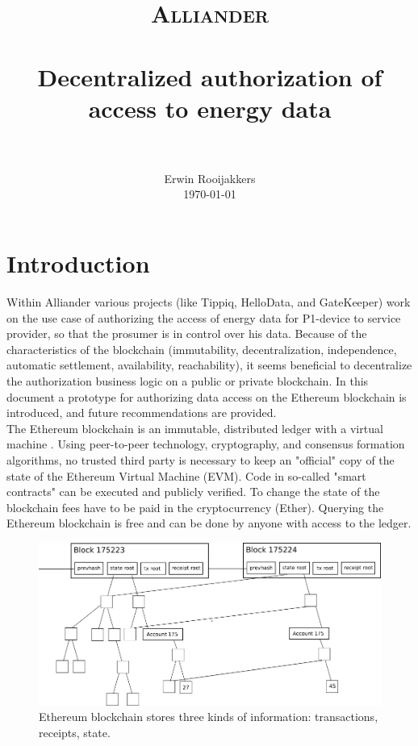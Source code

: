 \documentclass[paper=a4, fontsize=11pt]{scrartcl}
\title{
  \usefont{OT1}{bch}{b}{n}
  \normalfont \normalsize \textsc{Alliander} \\ [25pt]
  \horrule{0.5pt} \\[0.4cm]
  \huge Decentralized authorization of access to energy data \\
  \horrule{2pt} \\[0.5cm]
}
\author{
\normalfont \normalsize
Erwin Rooijakkers\\[-3pt] \normalsize
\today
}
\date{}
\numberwithin{equation}{section} %
\numberwithin{figure}{section}   %
\numberwithin{table}{section}    %
\begin{document}
\maketitle

\section{Introduction}


Within Alliander various projects (like Tippiq, HelloData, and GateKeeper) work
on the use case of authorizing the access of energy data for P1-device to
service provider, so that the prosumer is in control over his data. Because of
the characteristics of the blockchain (immutability, decentralization,
independence, automatic settlement, availability, reachability), it seems
beneficial to decentralize the authorization business logic on a public or
private blockchain. In this document a prototype for authorizing data access on
the Ethereum blockchain is
introduced, and future recommendations are provided.\\

The Ethereum blockchain is an immutable, distributed ledger with a virtual
machine \cite{ethereum}. Using peer-to-peer technology, cryptography, and
consensus formation algorithms, no trusted third party is necessary to keep an
"official" copy of the state of the Ethereum Virtual Machine (EVM). Code in
so-called "smart contracts" can be executed and publicly verified. To change the
state of the blockchain fees have to be paid in the cryptocurrency (Ether).
Querying the Ethereum blockchain is free and can be done by anyone with access
to the ledger.\\

\begin{figure}[h]
  \centering
  \includegraphics[width=\textwidth]{ethblockchain_full}
  \caption{Ethereum blockchain stores three kinds of information: transactions, receipts, state.}
  \label{fig:ethblockchain_full}
\end{figure}
\end{document}
